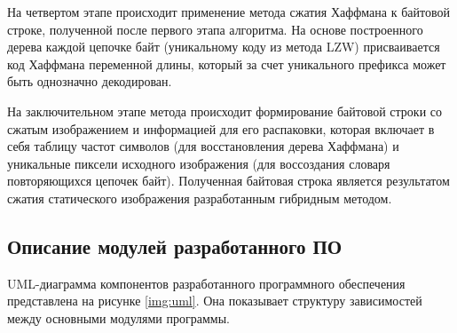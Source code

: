 На четвертом этапе происходит применение метода сжатия Хаффмана к байтовой строке, полученной после первого этапа алгоритма. На основе построенного дерева каждой цепочке байт (уникальному коду из метода LZW) присваивается код Хаффмана переменной длины, который за счет уникального префикса может быть однозначно декодирован.

На заключительном этапе метода происходит формирование байтовой строки со сжатым изображением и информацией для его распаковки, которая включает в себя таблицу частот символов (для восстановления дерева Хаффмана) и уникальные пиксели исходного изображения (для воссоздания словаря повторяющихся цепочек байт). Полученная байтовая строка является результатом сжатия статического изображения разработанным гибридным методом.

\subsection{Описание модулей разработанного ПО}

UML-диаграмма \cite{UML} компонентов разработанного программного обеспечения представлена на рисунке \ref{img:uml}. Она показывает структуру зависимостей между основными модулями программы.


